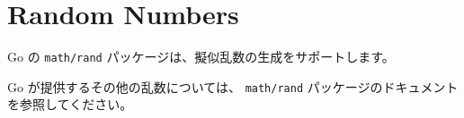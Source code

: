 \section{Random Numbers}

Go の \texttt{math/rand} パッケージは、擬似乱数の生成をサポートします。




Go が提供するその他の乱数については、 \texttt{math/rand} パッケージのドキュメントを参照してください。